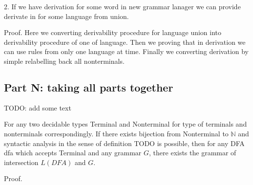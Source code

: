 2. If we have derivation for some word in new grammar lanager we can provide derivate in for some language from union.

Proof.
Here we converting derivability procedure for language union into derivability procedure of one of language.
Then we proving that in derivation we can use rules from only one language at time.
Finally we converting derivation by simple relabelling back all nonterminals.





\subsection{ Part N: taking all parts together}

TODO: add some text


\begin{theorem}
    For any two decidable types Terminal and Nonterminal for type of terminals and nonterminals correspondingly. If there exists bijection from Nonterminal to $\mathbb{N}$ and syntactic analysis in the sense of definition TODO is possible, then for any DFA dfa which accepts Terminal and any grammar $G$, there exists the grammar of intersection $L(DFA)$ and $G$.
\end{theorem}   

Proof. 

